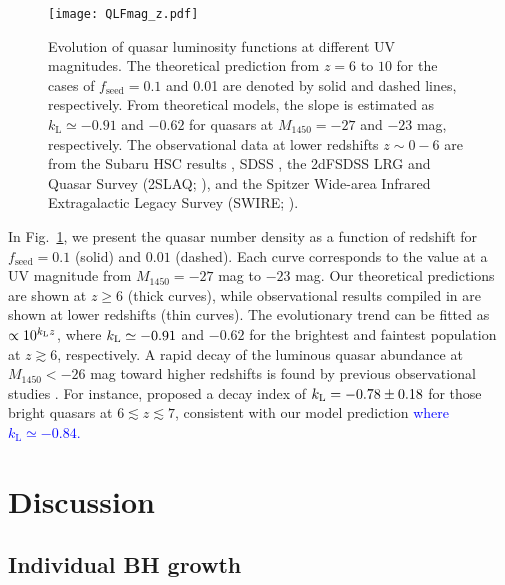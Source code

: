 \documentclass[twocolumn, twocolappendix]{aastex63}
\newcommand{\fseed}{f_\mathrm{seed}}
\newcommand{\Muv}{M_{1450}}
\newcommand{\blue}[1]{\textcolor{blue}{ #1}}
\begin{document}
\begin{CJK*}{UTF8}{gbsn}
\begin{figure}
\centering
\texttt{[image: QLFmag\_z.pdf]}
\caption{
Evolution of quasar luminosity functions at different UV magnitudes.
The theoretical prediction from $z=6$ to $10$ for the cases of $\fseed=0.1$ and 0.01 are denoted by solid and dashed lines, respectively.
From theoretical models, the slope is estimated as $k_\mathrm{L} \simeq -0.91$ and $-0.62$ for quasars at $\Muv=-27$ and $-23$ mag, respectively.
The observational data at lower redshifts $z\sim 0-6$ are from the Subaru HSC results \citep{2018PASJ...70S..34A,2018ApJ...869..150M,2020ApJ...904...89N},
SDSS \citep{2006AJ....131.2766R,2013ApJ...768..105M},
the 2dFSDSS LRG and Quasar Survey (2SLAQ; \citealt{2009MNRAS.399.1755C}),
and the Spitzer Wide-area Infrared Extragalactic Legacy Survey (SWIRE; \citealt{2008ApJ...675...49S}).
}
\label{fig:QLFmag_z}
\vspace{5mm}
\end{figure}


In Fig.~\ref{fig:QLFmag_z}, we present the quasar number density as a function of redshift for 
$\fseed =0.1$ (solid) and $0.01$ (dashed).
Each curve corresponds to the value at a UV magnitude from $\Muv=-27$ mag to $-23$ mag.
Our theoretical predictions are shown at $z\geq 6$ (thick curves),
while observational results compiled in \cite{2020ApJ...904...89N} are shown at lower redshifts (thin curves).
The evolutionary trend can be fitted as $\propto 10^{k_{\rm L}z}$,
where $k_{\rm L}\simeq -0.91$ and $-0.62$ for the brightest and faintest population
at $z\gtrsim 6$, respectively.
A rapid decay of the luminous quasar abundance at $\Muv<-26$ mag toward higher redshifts is found by 
previous observational studies \citep[e.g.,][]{2001AJ....122.2833F,2013ApJ...768..105M,2016ApJ...833..222J,2019ApJ...884...30W}.
For instance, \citet{2019ApJ...884...30W} proposed a decay index of $k_{\rm L}=-0.78\pm{0.18}$ for those bright quasars at $6\lesssim z \lesssim 7$,
consistent with our model prediction \blue{where $k_\mathrm{L} \simeq -0.84$.}


\vspace{2mm}
\section{Discussion}\label{sec:discussion}
\vspace{2mm}
\subsection{Individual BH growth}\label{sec:evol}


\end{CJK*}
\end{document}
